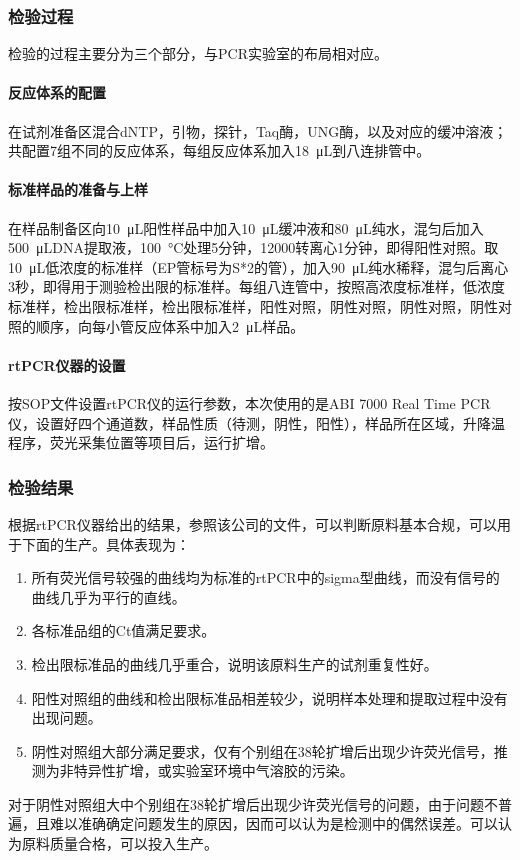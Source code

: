 \subsubsection{检验过程}

检验的过程主要分为三个部分，与PCR实验室的布局相对应。

\paragraph{反应体系的配置} 在试剂准备区混合dNTP，引物，探针，Taq酶，UNG酶，以及对应的缓冲溶液；共配置7组不同的反应体系，每组反应体系加入\SI{18}{\micro\liter}到八连排管中。

\paragraph{标准样品的准备与上样} 在样品制备区向\SI{10}{\micro\liter}阳性样品中加入\SI{10}{\micro\liter}缓冲液和\SI{80}{\micro\liter}纯水，混匀后加入\SI{500}{\micro\liter}DNA提取液，\SI{100}{\celsius}处理5分钟，12000转离心1分钟，即得阳性对照。取\SI{10}{\micro\liter}低浓度的标准样（EP管标号为S*2的管），加入\SI{90}{\micro\liter}纯水稀释，混匀后离心3秒，即得用于测验检出限的标准样。每组八连管中，按照高浓度标准样，低浓度标准样，检出限标准样，检出限标准样，阳性对照，阴性对照，阴性对照，阴性对照的顺序，向每小管反应体系中加入\SI{2}{\micro\liter}样品。

\paragraph{rtPCR仪器的设置} 按SOP文件设置rtPCR仪的运行参数，本次使用的是ABI 7000 Real Time PCR仪，设置好四个通道数，样品性质（待测，阴性，阳性），样品所在区域，升降温程序，荧光采集位置等项目后，运行扩增。

\subsubsection{检验结果}

根据rtPCR仪器给出的结果，参照该公司的文件，可以判断原料基本合规，可以用于下面的生产。具体表现为：

\begin{enumerate}
    \item 所有荧光信号较强的曲线均为标准的rtPCR中的sigma型曲线，而没有信号的曲线几乎为平行的直线。
    \item 各标准品组的Ct值满足要求。
    \item 检出限标准品的曲线几乎重合，说明该原料生产的试剂重复性好。
    \item 阳性对照组的曲线和检出限标准品相差较少，说明样本处理和提取过程中没有出现问题。
    \item 阴性对照组大部分满足要求，仅有个别组在38轮扩增后出现少许荧光信号，推测为非特异性扩增，或实验室环境中气溶胶的污染。
\end{enumerate}
对于阴性对照组大中个别组在38轮扩增后出现少许荧光信号的问题，由于问题不普遍，且难以准确确定问题发生的原因，因而可以认为是检测中的偶然误差。可以认为原料质量合格，可以投入生产。

